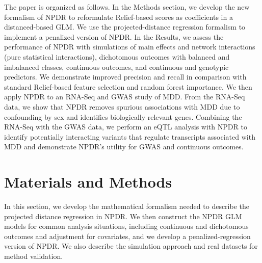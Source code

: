 \documentclass{bioinfo}
\begin{document}
The paper is organized as follows.
In the Methods section, we develop the new formalism of NPDR to reformulate Relief-based scores as coefficients in a distanced-based GLM.
We use the projected-distance regression formalism to implement a penalized version of NPDR.
In the Results, we assess the performance of NPDR with simulations of main effects and network interactions (pure statistical interactions), dichotomous outcomes with balanced and imbalanced classes, continuous outcomes, and continuous and genotypic predictors. We demonstrate improved precision and recall in comparison with standard Relief-based feature selection and random forest importance.
We then apply NPDR to an RNA-Seq and GWAS study of MDD.
From the RNA-Seq data, we show that NPDR removes spurious associations with MDD due to confounding by sex and identifies biologically relevant genes.
Combining the RNA-Seq with the GWAS data, we perform an eQTL analysis with NPDR to identify potentially interacting variants that regulate transcripts associated with MDD and demonstrate NPDR's utility for GWAS and continuous outcomes.



\section{Materials and Methods}
In this section, we develop the mathematical formalism needed to describe the projected distance regression in NPDR.
We then construct the NPDR GLM models for common analysis situations, including continuous and dichotomous outcomes and adjustment for covariates, and we develop a penalized-regression version of NPDR. 
We also describe the simulation approach and real datasets for method validation.

\def\ri{R_i}
\def\rj{R_j}
\def\kmi{k_{M_i}}
\def\khi{k_{H_i}}
\def\hji{H_{j_i}}
\def\ma{\overline{M}_a}
\def\ha{\overline{H}_a}
\def\mnu{M_\nu}
\def\hnu{H_\nu}
\def\myd{\text{diff}}
\def\ka{\bar{k}_\alpha}
\end{document}
